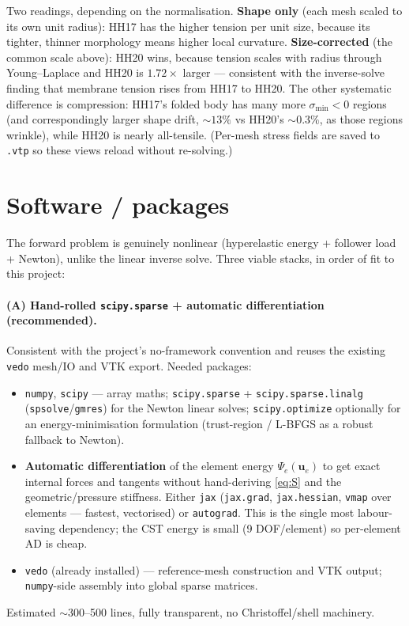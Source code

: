 \documentclass[11pt]{article}
\newcommand{\vv}[1]{\bm{#1}}          %
\begin{document}
Two readings, depending on the normalisation. \textbf{Shape only} (each mesh scaled to its own unit
radius): HH17 has the higher tension per unit size, because its tighter, thinner morphology means
higher local curvature. \textbf{Size-corrected} (the common scale above): HH20 wins, because tension
scales with radius through Young--Laplace and HH20 is $1.72\times$ larger --- consistent with the
inverse-solve finding that membrane tension rises from HH17 to HH20. The other systematic difference
is compression: HH17's folded body has many more $\sigma_{\min}<0$ regions (and correspondingly
larger shape drift, ${\sim}13\%$ vs HH20's ${\sim}0.3\%$, as those regions wrinkle), while HH20 is
nearly all-tensile. (Per-mesh stress fields are saved to \texttt{.vtp} so these views reload without
re-solving.)

\section{Software / packages}
\label{sec:packages}

The forward problem is genuinely nonlinear (hyperelastic energy + follower load +
Newton), unlike the linear inverse solve. Three viable stacks, in order of fit to this
project:

\paragraph{(A) Hand-rolled \texttt{scipy.sparse} + automatic differentiation
(recommended).}
Consistent with the project's no-framework convention and reuses the existing
\texttt{vedo} mesh/IO and VTK export. Needed packages:
\begin{itemize}[nosep]
  \item \texttt{numpy}, \texttt{scipy} --- array maths; \texttt{scipy.sparse} +
        \texttt{scipy.sparse.linalg} (\texttt{spsolve}/\texttt{gmres}) for the Newton
        linear solves; \texttt{scipy.optimize} optionally for an energy-minimisation
        formulation (trust-region / L-BFGS as a robust fallback to Newton).
  \item \textbf{Automatic differentiation} of the element energy $\Psi_e(\vv u_e)$ to get
        exact internal forces and tangents without hand-deriving \eqref{eq:S} and the
        geometric/pressure stiffness. Either \texttt{jax} (\texttt{jax.grad},
        \texttt{jax.hessian}, \texttt{vmap} over elements --- fastest, vectorised) or
        \texttt{autograd}. This is the single most labour-saving dependency; the CST
        energy is small (9 DOF/element) so per-element AD is cheap.
  \item \texttt{vedo} (already installed) --- reference-mesh construction and VTK output;
        \texttt{numpy}-side assembly into global sparse matrices.
\end{itemize}
Estimated $\sim$300--500 lines, fully transparent, no Christoffel/shell machinery.
\end{document}
